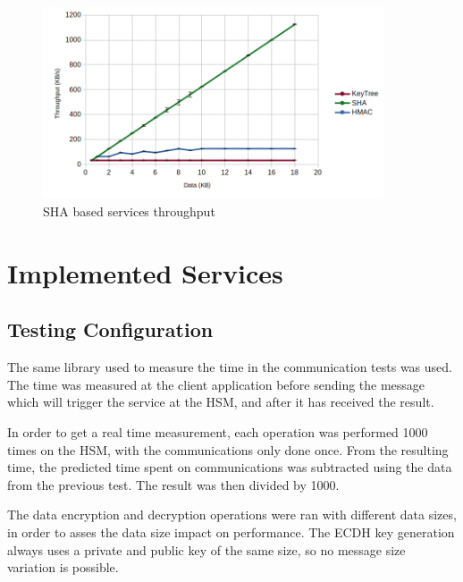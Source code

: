 \begin{figure}[h!]
	\centering
	\includegraphics[width=0.9\textwidth]{./Images/sha-tput.png}
	\caption{SHA based services throughput}
	\label{fig:performance:sha:tput}
\end{figure}

\section{Implemented Services}\label{chap:evaluation:services}

\subsection{Testing Configuration}\label{chap:evaluation:services:config}

The same library used to measure the time in the communication tests was used.
The time was measured at the client application before sending the message which will trigger the service at the HSM, and after it has received the result.

In order to get a real time measurement, each operation was performed 1000 times on the HSM, with the communications only done once.
From the resulting time, the predicted time spent on communications was subtracted using the data from the previous test. The result was then divided by 1000.

The data encryption and decryption operations were ran with different data sizes, in order to asses the data size impact on performance.
The ECDH key generation always uses a private and public key of the same size, so no message size variation is possible.

